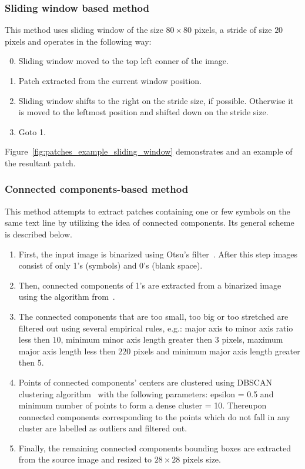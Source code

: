 \documentclass[a4paper,conference]{IEEEtran}
\begin{document}
\subsubsection{Sliding window based method}
This method uses sliding window of the size $80\times 80$ pixels, a stride of size $20$ pixels and operates in the following way:
\begin{enumerate}
  \setcounter{enumi}{-1}
	\item Sliding window moved to the top left conner of the image.
	\item Patch extracted from the current window position.
	\item Sliding window shifts to the right on the stride size, if possible. Otherwise it is moved to the leftmost position and shifted down on the stride size.
	\item Goto 1.
\end{enumerate} 
Figure~\ref{fig:patches_example_sliding_window} demonstrates and an example of the resultant patch. 

\subsubsection{Connected components-based method}
This method attempts to extract patches containing one or few symbols on the same text line by utilizing the idea of connected components. Its general scheme is described below.
\begin{enumerate}
	\item First, the input image is binarized using Otsu's filter~\cite{otsu1975threshold}. After this step images consist of only 1's (symbols) and 0's (blank space).
	\item Then, connected components of 1's are extracted from a binarized image using the algorithm from~\cite{fiorio1996connected_components}. 
	\item The connected components that are too small, too big or too stretched are filtered out using several empirical rules, e.g.: major axis to minor axis ratio less then $10$, minimum minor axis length greater then $3$ pixels, maximum major axis length less then $220$ pixels and  minimum major axis length greater then 5.
	\item Points of connected components' centers are clustered using DBSCAN clustering algorithm~\cite{ester1996dbscan,GranVolk} with the following parameters: epsilon = 0.5 and minimum number of points to form a dense cluster = 10. Thereupon connected components corresponding to the points which do not fall in any cluster are labelled as outliers and filtered out.
	\item Finally, the remaining connected components bounding boxes are extracted from the source image and resized to $28\times 28$ pixels size.
\end{enumerate}
\end{document}
